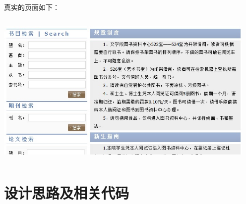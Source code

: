 ﻿\documentclass[UTF8]{ctexart}
\begin{document}
\begin{flushleft}
\par{}
真实的页面如下：
\par{}
\includegraphics[width=5.00in,height=3.00in]{figure37.jpg}
\par{}
\section{设计思路及相关代码}

\end{flushleft}
\end{document}
